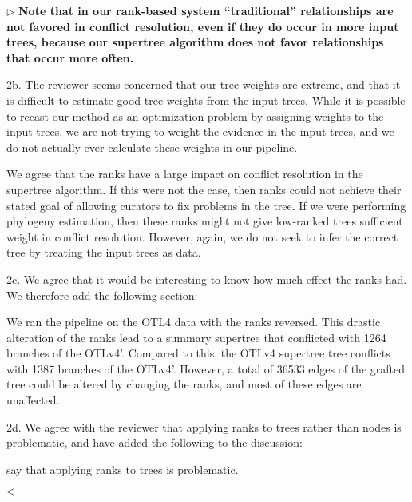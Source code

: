 \documentclass{article}
\newenvironment{reply}{$\triangleright$\bf}{$\triangleleft$}
\renewenvironment{quote}
               {\list{}{\rightmargin\leftmargin}%
                \item\relax\normalfont}
               {\endlist}
\begin{document}
\begin{reply}
Note that in our rank-based system ``traditional'' relationships are not favored in conflict resolution, even if they do occur in more input trees, because our supertree algorithm does not favor relationships that occur more often.


2b. The reviewer seems concerned that our tree weights are extreme, and that it is difficult to estimate good tree weights from the input trees.  While it is possible to recast our method as an optimization problem by assigning weights to the input trees, we are not trying to weight the evidence in the input trees, and we do not actually ever calculate these weights in our pipeline.

We agree that the ranks have a large impact on conflict resolution in the supertree algorithm.   If this were not the case, then ranks could not achieve their stated goal of allowing curators to fix problems in the tree.  If we were performing phylogeny estimation, then these ranks might not give low-ranked trees sufficient weight in conflict resolution.  However, again, we do not seek to infer the correct tree by treating the input trees as data.


2c. We agree that it would be interesting to know how much effect the ranks had.  We therefore add the following section:
\begin{quote}
We ran the pipeline on the OTL4 data with the ranks reversed.  This drastic alteration of the ranks lead to a summary supertree that conflicted with 1264 branches of the OTLv4'.  Compared to this, the OTLv4 supertree tree conflicts with 1387 branches of the OTLv4’.  However, a total of 36533 edges of the grafted tree could be altered by changing the ranks, and most of these edges are unaffected.
\end{quote}

2d. We agree with the reviewer that applying ranks to trees rather than nodes is problematic, and have added the following to the discussion:
\begin{quote}
 say that applying ranks to trees is problematic.
\end{quote}


\end{reply}
\end{document}
